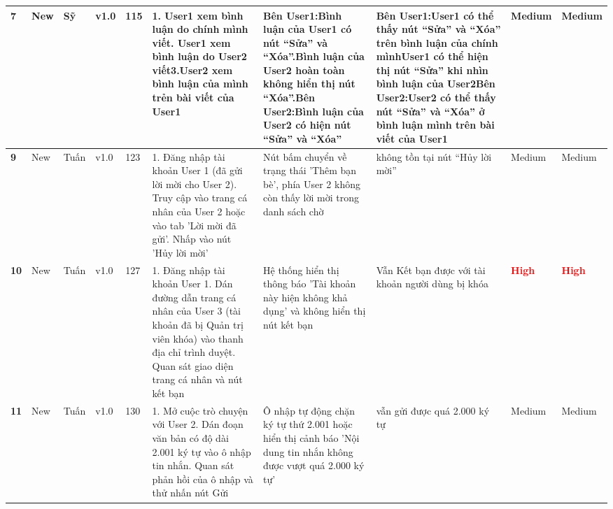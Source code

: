 \documentclass[11pt,a4paper]{article}
\begin{document}
\begin{longtable}{|C{0.9cm}|C{0.85cm}|C{0.95cm}|C{1.05cm}|C{0.85cm}|L{3.25cm}|L{2.7cm}|L{2.7cm}|C{1.0cm}|C{1.0cm}|}
\textbf{7} & New & Sỹ & v1.0 & 115 & 1. User1 xem bình luận do chính mình viết. User1 xem bình luận do User2 viết\newline 3.User2 xem bình luận của mình trẻn bài viết của User1 & Bên User1:\newline Bình luận của User1 có nút ``Sửa'' và ``Xóa''.\newline Bình luận của User2 hoàn toàn không hiển thị nút ``Xóa''.\newline Bên User2:\newline Bình luận của User2 có hiện nút ``Sửa'' và ``Xóa'' & Bên User1:\newline User1 có thể thấy nút ``Sửa'' và ``Xóa'' trên bình luận của chính mình\newline User1 có thể hiện thị nút ``Sửa'' khi nhìn bình luận của User2\newline Bên User2:\newline User2 có thể thấy nút ``Sửa'' và ``Xóa'' ở bình luận mình trên bài viết của User1 & Medium & Medium \\ \hline
\textbf{9} & New & Tuấn & v1.0 & 123 & 1. Đăng nhập tài khoản User 1 (đã gửi lời mời cho User 2). Truy cập vào trang cá nhân của User 2 hoặc vào tab 'Lời mời đã gửi'. Nhấp vào nút 'Hủy lời mời' & Nút bấm chuyển về trạng thái 'Thêm bạn bè', phía User 2 không còn thấy lời mời trong danh sách chờ & không tồn tại nút ``Hủy lời mời'' & Medium & Medium \\ \hline
\textbf{10} & New & Tuấn & v1.0 & 127 & 1. Đăng nhập tài khoản User 1. Dán đường dẫn trang cá nhân của User 3 (tài khoản đã bị Quản trị viên khóa) vào thanh địa chỉ trình duyệt. Quan sát giao diện trang cá nhân và nút kết bạn & Hệ thống hiển thị thông báo 'Tài khoản này hiện không khả dụng' và không hiển thị nút kết bạn & Vẫn Kết bạn được với tài khoản người dùng bị khóa & \textcolor{red}{\textbf{High}} & \textcolor{red}{\textbf{High}} \\ \hline
\textbf{11} & New & Tuấn & v1.0 & 130 & 1. Mở cuộc trò chuyện với User 2. Dán đoạn văn bản có độ dài 2.001 ký tự vào ô nhập tin nhắn. Quan sát phản hồi của ô nhập và thử nhấn nút Gửi & Ô nhập tự động chặn ký tự thứ 2.001 hoặc hiển thị cảnh báo 'Nội dung tin nhắn không được vượt quá 2.000 ký tự' & vẫn gửi được quá 2.000 ký tự & Medium & Medium \\ \hline

\end{longtable}
\end{document}
